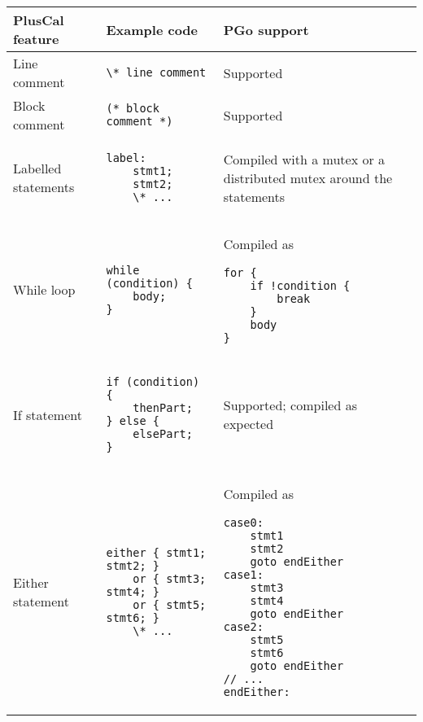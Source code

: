\begin{center}
\lstset{style=tabularstyle}
\renewcommand{\arraystretch}{1.5}
\begin{longtable}{ || m{} | m{} | m{} || }
	\hline
	\textbf{PlusCal feature} & \textbf{Example code} & \textbf{PGo support} \\
	\hline\hline
	Line comment & \lstinline[language=pcal]|\* line comment| & Supported \\
	\hline
	Block comment & \lstinline[language=pcal]|(* block comment *)| & Supported \\
	\hline
	Labelled statements &
	\begin{lstlisting}[language=pcal]
label:
	stmt1;
	stmt2;
	\* ...
	\end{lstlisting} &
	Compiled with a mutex or a distributed mutex around the statements \\
	\hline
	While loop &
	\begin{lstlisting}[language=pcal]
while (condition) {
	body;
}
	\end{lstlisting} &
	Compiled as
	\begin{lstlisting}[language=golang]
for {
	if !condition {
		break
	}
	body
}
	\end{lstlisting} \\
	\hline
	If statement &
	\begin{lstlisting}[language=pcal]
if (condition) {
	thenPart;
} else {
	elsePart;
}
	\end{lstlisting} &
	Supported; compiled as expected \\
	\hline
	Either statement &
	\begin{lstlisting}[language=pcal]
either { stmt1; stmt2; }
    or { stmt3; stmt4; }
    or { stmt5; stmt6; }
    \* ...
	\end{lstlisting} &
	Compiled as
	\begin{lstlisting}[language=golang]
case0:
	stmt1
	stmt2
	goto endEither
case1:
	stmt3
	stmt4
	goto endEither
case2:
	stmt5
	stmt6
	goto endEither
// ...
endEither:
	\end{lstlisting}


\end{longtable}
\end{center}
